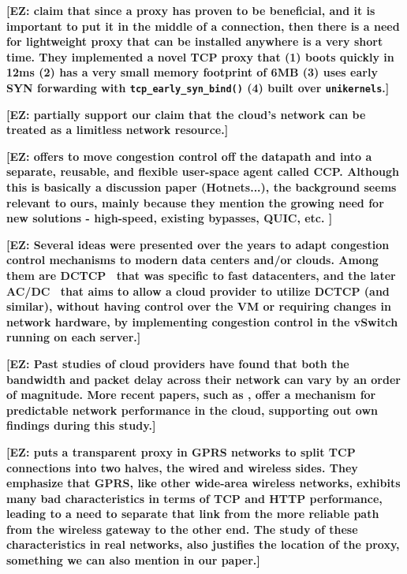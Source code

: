\documentclass[sigconf,usenames,dvipsnames,geometry]{acmart}
\newcommand{\mycomm}[3]{{\color{#2} \textbf{[#1: #3]}}}
\newcommand{\mycomm}[3]{}
\newcommand{\EZ}[1]{\mycomm{EZ}{BlueGreen}{#1}}
\begin{document}
\EZ{ \cite{siracusano2016miniproxy} claim that since a proxy has proven to be beneficial, and it is important to put it in the middle of a connection, then there is a need for lightweight proxy that can be installed anywhere is a very short time. They implemented a novel TCP proxy that (1) boots quickly in 12ms (2) has a very small memory footprint of 6MB (3) uses early SYN forwarding with \texttt{tcp\_early\_syn\_bind()} (4) built over \texttt{unikernels}.}

\EZ{ \cite{jeyakumar2012eyeq} partially support our claim that the cloud's network can be treated as a limitless network resource.}

\EZ{ \cite{narayan2017ccp} offers to move congestion control off the datapath and into a separate, reusable,
and flexible user-space agent called CCP. Although this is basically a discussion paper (Hotnets...), the background seems relevant to ours, mainly because they mention the growing need for new solutions - high-speed, existing bypasses, QUIC, etc. }

\EZ{ Several ideas were presented over the years to adapt congestion control mechanisms to modern data centers and/or clouds. Among them are DCTCP~\cite{alizadeh2010dctcp} that was specific to fast datacenters, and the later AC/DC~\cite{keqiang2016acdc} that aims to allow a cloud provider to utilize DCTCP (and similar), without having control over the VM or requiring changes in network hardware, by implementing congestion control in the vSwitch running on each server.}

\EZ{Past studies of cloud providers have found that both the bandwidth and packet delay across their network can vary by an order of magnitude. More recent papers, such as \cite{jang2015silo}, offer a mechanism for predictable network performance in the cloud, supporting out own findings during this study.}

\EZ{\cite{chakravorty2003aggregation} puts a transparent proxy in GPRS networks to split TCP connections into two halves, the wired and wireless sides. They emphasize that GPRS, like other wide-area wireless networks, exhibits many bad characteristics in terms of TCP and HTTP performance, leading to a need to separate that link from the more reliable path from the wireless gateway to the other end. The study of these characteristics in real networks, also justifies the location of the proxy, something we can also mention in our paper.}
\end{document}
